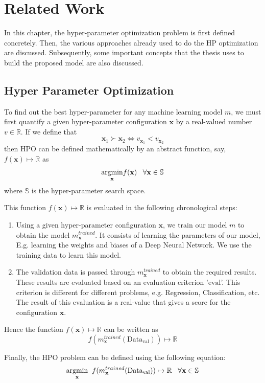 \documentclass[12pt, twoside, ngerman]{report}
\begin{document}
\chapter{Related Work}\label{chap:relatedWork}

In this chapter,  the hyper-parameter optimization problem is first defined concretely.
Then, the various approaches already used to do the HP optimization are discussed.
Subsequently,  some important concepts that the thesis uses to build the proposed model are also discussed.

\section{Hyper Parameter Optimization}
To find out the best hyper-parameter for any machine learning model $m$, we must first quantify a given hyper-parameter configuration $\textbf{x}$ by a real-valued number $v \in \mathbb{R}$.
If we define that
$$
\textbf{x}_1 \succ  \textbf{x}_2 \iff v_{\textbf{x}_1} < v_{\textbf{x}_2}
$$
then HPO can be defined mathematically by an abstract function, say,  $f(\textbf{x}) \mapsto \mathbb{R}$ as
$$
     \underset{\rm \textbf{x}}{\rm argmin}  f(\textbf{x}) \;\;\;  \forall \textbf{x} \in \mathbb{S}
$$
where $\mathbb{S}$ is the hyper-parameter search space.

This function $f(\textbf{x}) \mapsto \mathbb{R}$ is evaluated in the following chronological steps:
\begin{enumerate}
\item Using a given hyper-parameter configuration $\textbf{x}$,  we train our model $m$ to obtain the model $m^{trained}_\textbf{x}$. It consists of learning the parameters of our model, E.g. learning the weights and biases of a Deep Neural Network.
We use the training data to learn this model.
\item The validation data is passed through $m^{trained}_\textbf{x}$ to obtain the required results.
These results are evaluated based on an evaluation criterion '$\textrm{eval}$'. This criterion is different for different problems, e.g. Regression, Classification, etc.
The result of this evaluation is a real-value that gives a score for the configuration $\textbf{x}$.
\end{enumerate}

Hence the function $f(\textbf{x}) \mapsto \mathbb{R}$ can be written as 
$$
f(m^{trained}_\textbf{x} (\textrm{Data}_\textrm{val})) \mapsto \mathbb{R}
$$

Finally, the HPO problem can be defined using the following equation:
\begin{equation}\label{eq:hpoobjectivefunc}
\underset{\rm \textbf{x}}{\rm argmin} \;\; f(m^{trained}_\textbf{x} (\textrm{Data}_\textrm{val})) \mapsto \mathbb{R}   \;\;\;  \forall \textbf{x} \in \mathbb{S}
\end{equation}
\end{document}
